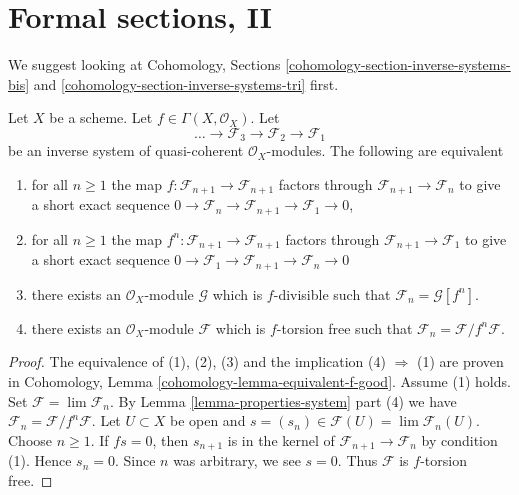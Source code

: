 \section{Formal sections, II}
\label{section-formal-functions-principal}

\noindent
We suggest looking at
Cohomology, Sections
\ref{cohomology-section-inverse-systems-bis} and
\ref{cohomology-section-inverse-systems-tri} first.

\begin{lemma}
\label{lemma-equivalent-f-good}
Let $X$ be a scheme. Let $f \in \Gamma(X, \mathcal{O}_X)$. Let
$$
\ldots \to \mathcal{F}_3 \to \mathcal{F}_2 \to \mathcal{F}_1
$$
be an inverse system of quasi-coherent $\mathcal{O}_X$-modules.
The following are equivalent
\begin{enumerate}
\item for all $n \geq 1$ the map
$f : \mathcal{F}_{n + 1} \to \mathcal{F}_{n + 1}$ factors
through $\mathcal{F}_{n + 1} \to \mathcal{F}_n$ to give a
short exact sequence
$0 \to \mathcal{F}_n \to \mathcal{F}_{n + 1} \to \mathcal{F}_1 \to 0$,
\item for all $n \geq 1$ the map
$f^n : \mathcal{F}_{n + 1} \to \mathcal{F}_{n + 1}$
factors through $\mathcal{F}_{n + 1} \to \mathcal{F}_1$
to give a short exact sequence
$0 \to \mathcal{F}_1 \to \mathcal{F}_{n + 1} \to \mathcal{F}_n \to 0$
\item there exists an $\mathcal{O}_X$-module $\mathcal{G}$
which is $f$-divisible such that $\mathcal{F}_n = \mathcal{G}[f^n]$.
\item there exists an $\mathcal{O}_X$-module $\mathcal{F}$ which is
$f$-torsion free such that $\mathcal{F}_n = \mathcal{F}/f^n\mathcal{F}$.
\end{enumerate}
\end{lemma}

\begin{proof}
The equivalence of (1), (2), (3) and the implication (4) $\Rightarrow$ (1)
are proven in Cohomology, Lemma \ref{cohomology-lemma-equivalent-f-good}.
Assume (1) holds. Set
$\mathcal{F} = \lim \mathcal{F}_n$. By Lemma \ref{lemma-properties-system}
part (4) we have $\mathcal{F}_n = \mathcal{F}/f^n\mathcal{F}$.
Let $U \subset X$ be open and
$s = (s_n) \in \mathcal{F}(U) = \lim \mathcal{F}_n(U)$.
Choose $n \geq 1$. If $fs = 0$, then $s_{n + 1}$ is in the kernel of
$\mathcal{F}_{n + 1} \to \mathcal{F}_n$ by condition (1).
Hence $s_n = 0$. Since $n$ was arbitrary, we see $s = 0$.
Thus $\mathcal{F}$ is $f$-torsion free.
\end{proof}

